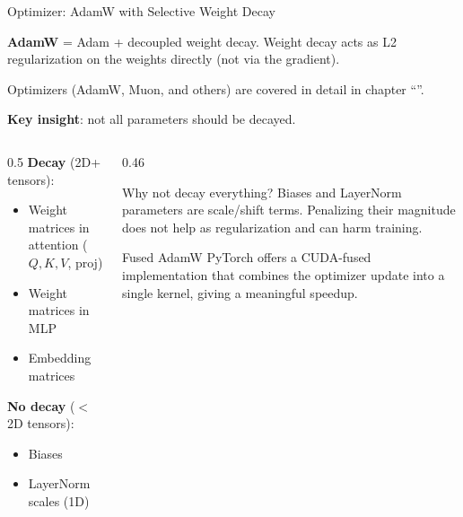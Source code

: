 \begin{frame}{Optimizer: AdamW with Selective Weight Decay}

  \textbf{AdamW} = Adam + decoupled weight decay. Weight decay acts as L2 regularization on the weights directly (not via the gradient).

  \begin{block}{}
    Optimizers (AdamW, Muon, and others) are covered in detail in chapter ``''.
  \end{block}

  \vspace{0.5em}
  \textbf{Key insight}: not all parameters should be decayed.

  \begin{columns}
    \begin{column}{0.5\textwidth}
      \textbf{Decay} (2D+ tensors):
      \begin{itemize}
        \item Weight matrices in attention ($Q, K, V$, proj)
        \item Weight matrices in MLP
        \item Embedding matrices
      \end{itemize}

      \vspace{0.3em}
      \textbf{No decay} ($<$ 2D tensors):
      \begin{itemize}
        \item Biases
        \item LayerNorm scales (1D)
      \end{itemize}
    \end{column}
    \begin{column}{0.46\textwidth}
      \begin{block}{Why not decay everything?}
        Biases and LayerNorm parameters are scale/shift terms. Penalizing their magnitude does not help as regularization and can harm training.
      \end{block}

      \vspace{0.3em}
      \begin{block}{Fused AdamW}
        PyTorch offers a CUDA-fused implementation that combines the optimizer update into a single kernel, giving a meaningful speedup.
      \end{block}
    \end{column}
  \end{columns}
\end{frame}

